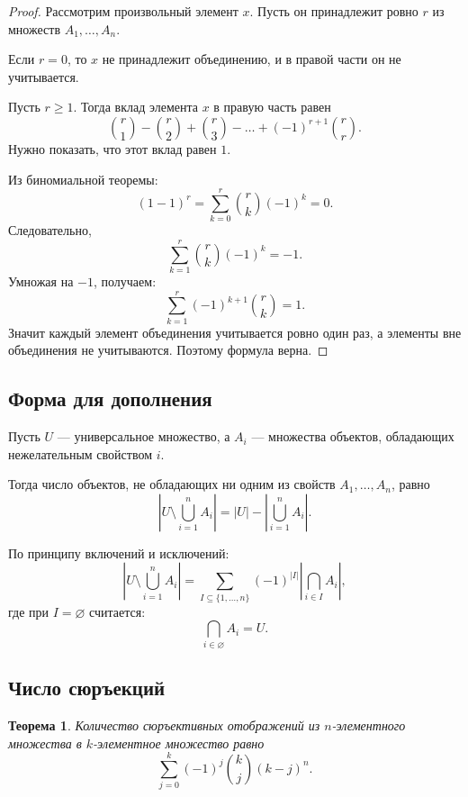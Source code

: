\documentclass[12pt,a4paper]{article}
\newtheorem{theorem}{Теорема}
\begin{document}
\begin{proof}
Рассмотрим произвольный элемент $x$. Пусть он принадлежит ровно $r$ из множеств $A_1,\dots,A_n$.

Если $r=0$, то $x$ не принадлежит объединению, и в правой части он не учитывается.

Пусть $r\ge 1$. Тогда вклад элемента $x$ в правую часть равен
\[
\binom{r}{1}-\binom{r}{2}+\binom{r}{3}-\dots+(-1)^{r+1}\binom{r}{r}.
\]
Нужно показать, что этот вклад равен $1$.

Из биномиальной теоремы:
\[
(1-1)^r = \sum_{k=0}^r \binom{r}{k}(-1)^k=0.
\]
Следовательно,
\[
\sum_{k=1}^r \binom{r}{k}(-1)^k=-1.
\]
Умножая на $-1$, получаем:
\[
\sum_{k=1}^r (-1)^{k+1}\binom{r}{k}=1.
\]
Значит каждый элемент объединения учитывается ровно один раз, а элементы вне объединения не учитываются. Поэтому формула верна.
\end{proof}

\subsection{Форма для дополнения}

Пусть $U$ --- универсальное множество, а $A_i$ --- множества объектов, обладающих нежелательным свойством $i$.

Тогда число объектов, не обладающих ни одним из свойств $A_1,\dots,A_n$, равно
\[
\left|U\setminus\bigcup_{i=1}^n A_i\right|
=
|U|
-
\left|\bigcup_{i=1}^n A_i\right|.
\]

По принципу включений и исключений:
\[
\left|U\setminus\bigcup_{i=1}^n A_i\right|
=
\sum_{I\subseteq \{1,\dots,n\}}
(-1)^{|I|}
\left|\bigcap_{i\in I}A_i\right|,
\]
где при $I=\varnothing$ считается:
\[
\bigcap_{i\in \varnothing}A_i=U.
\]

\subsection{Число сюръекций}

\begin{theorem}
Количество сюръективных отображений из $n$-элементного множества в $k$-элементное множество равно
\[
\sum_{j=0}^{k}(-1)^j\binom{k}{j}(k-j)^n.
\]
\end{theorem}
\end{document}
